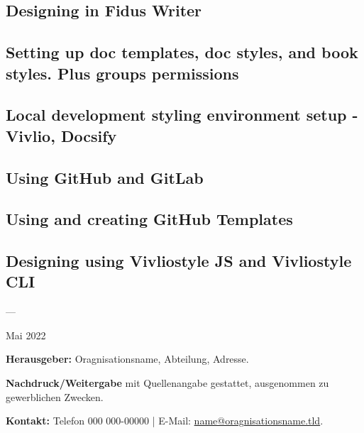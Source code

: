 \documentclass{article}
\begin{document}
\subsection{Designing in Fidus Writer}\label{H9146823}



\subsection{Setting up doc templates, doc styles, and book styles. Plus groups permissions}\label{H5306137}



\subsection{Local development styling environment setup - Vivlio, Docsify}\label{H9966663}



\subsection{Using GitHub and GitLab}\label{H2916391}



\subsection{Using and creating GitHub Templates}\label{H187677}



\subsection{Designing using Vivliostyle JS and Vivliostyle CLI}\label{H8096298}



---


Mai 2022


\textbf{Herausgeber:} Oragnisationsname, Abteilung, Adresse.


\textbf{Nachdruck/Weitergabe} mit Quellenangabe gestattet, ausgenommen zu gewerblichen Zwecken.


\textbf{Kontakt:} Telefon 000 000-00000 | E-Mail: \href{name@oragnisationsname.tld}{name@oragnisationsname.tld}.
\end{document}
